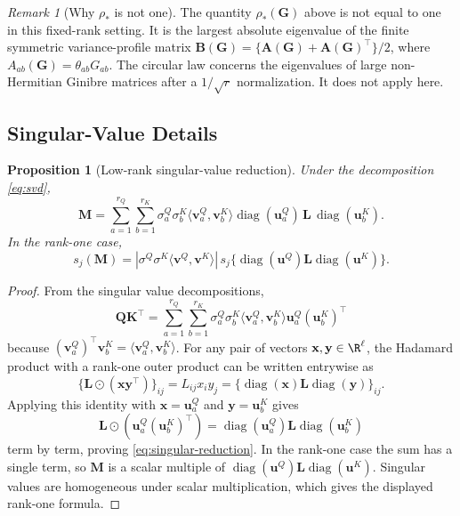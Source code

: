 \documentclass{article}
\newcommand{\diag}{\operatorname{diag}}
\newcommand{\hadamard}{\mathbin{\odot}}
\newcommand{\bA}{\mathbf{A}}
\newcommand{\bB}{\mathbf{B}}
\newcommand{\bM}{\mathbf{M}}
\newcommand{\bL}{\mathbf{L}}
\newcommand{\bQ}{\mathbf{Q}}
\newcommand{\bK}{\mathbf{K}}
\newcommand{\bu}{\mathbf{u}}
\newcommand{\bv}{\mathbf{v}}
\newcommand{\bG}{\mathbf{G}}
\newtheorem{proposition}[theorem]{Proposition}
\theoremstyle{definition}
\theoremstyle{remark}
\newtheorem{remark}[theorem]{Remark}
\begin{document}
\begin{remark}[Why $\rho_*$ is not one]
The quantity $\rho_*(\bG)$ above is not equal to one in this fixed-rank setting.
It is the largest absolute eigenvalue of the finite symmetric variance-profile
matrix $\bB(\bG)=\{\bA(\bG)+\bA(\bG)^\top\}/2$, where
$A_{ab}(\bG)=\theta_{ab}G_{ab}$.  The circular law concerns the eigenvalues of
large non-Hermitian Ginibre matrices after a $1/\sqrt r$ normalization.  It does
not apply here.
\label{rem:rho-star-not-one}
\end{remark}

\subsection{Singular-Value Details}
\label{lr:singular-details}

\begin{proposition}[Low-rank singular-value reduction]
Under the decomposition \eqref{eq:svd},
\begin{equation}
    \bM
    =
    \sum_{a=1}^{r_Q}
    \sum_{b=1}^{r_K}
    \sigma^Q_a\sigma^K_b
    \langle \bv^Q_a,\bv^K_b\rangle
    \diag(\bu^Q_a)\,\bL\,\diag(\bu^K_b).
    \label{eq:singular-reduction}
\end{equation}
In the rank-one case,
\[
    s_j(\bM)
    =
    |\sigma^Q\sigma^K\langle \bv^Q,\bv^K\rangle|\,
    s_j\{\diag(\bu^Q)\bL\diag(\bu^K)\}.
\]
\label{prop:singular-reduction}
\end{proposition}

\begin{proof}
From the singular value decompositions,
\[
    \bQ\bK^\top
    =
    \sum_{a=1}^{r_Q}
    \sum_{b=1}^{r_K}
    \sigma^Q_a\sigma^K_b
    \langle \bv^Q_a,\bv^K_b\rangle
    \bu^Q_a(\bu^K_b)^\top
\]
because $(\bv^Q_a)^\top\bv^K_b=\langle\bv^Q_a,\bv^K_b\rangle$.  For any pair
of vectors $\mathbf x,\mathbf y\in\R^\ell$, the Hadamard product with a rank-one
outer product can be written entrywise as
\[
    \{\bL\hadamard(\mathbf x\mathbf y^\top)\}_{ij}
    =
    L_{ij}x_i y_j
    =
    \{\diag(\mathbf x)\bL\diag(\mathbf y)\}_{ij}.
\]
Applying this identity with
$\mathbf x=\bu^Q_a$ and $\mathbf y=\bu^K_b$ gives
\[
    \bL\hadamard(\bu^Q_a(\bu^K_b)^\top)
    =
    \diag(\bu^Q_a)\bL\diag(\bu^K_b)
\]
term by term, proving \eqref{eq:singular-reduction}.  In the rank-one case the
sum has a single term, so $\bM$ is a scalar multiple of
$\diag(\bu^Q)\bL\diag(\bu^K)$.  Singular values are homogeneous under scalar
multiplication, which gives the displayed rank-one formula.
\end{proof}
\end{document}
